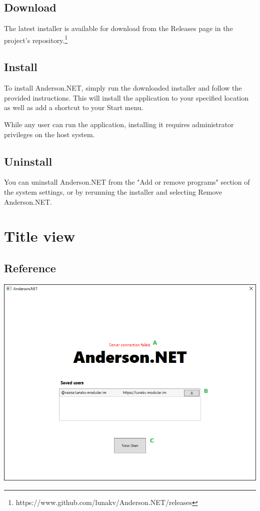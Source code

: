 \documentclass[titlepage]{scrartcl}
\begin{document}
\subsection{Download}
The latest installer is available for download from the Releases page in the project's repository.\footnote{https://www.github.com/lunakv/Anderson.NET/releases}

\subsection{Install}
To install Anderson.NET, simply run the downloaded installer and follow the provided instructions. This will install the application to your specified location as well as add a shortcut to your Start menu.

While any user can run the application, installing it requires administrator privileges on the host system.

\subsection{Uninstall}
You can uninstall Anderson.NET from the "Add or remove programs" section of the system settings, or by rerunning the installer and selecting Remove Anderson.NET.

\section{Title view}
\subsection{Reference} 
\begin{center}
    \includegraphics[width=410pt]{title-window.png} 
\end{center}
\end{document}
